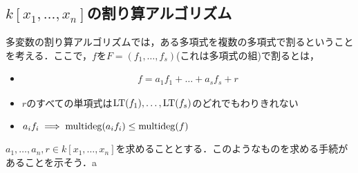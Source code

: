 \documentclass[9pt]{ltjsarticle}
\begin{document}
\subsection{$k[x_1,\dots,x_n]$の割り算アルゴリズム}
多変数の割り算アルゴリズムでは，ある多項式を複数の多項式で割るということを考える．ここで，$f$を$F=(f_1,\dots,f_s)$(これは多項式の組)で割るとは，
\begin{itemize}
 \item
\begin{align}
 f = a_1 f_1 + \dots + a_s f_s + r
\end{align}
 \item
$r$のすべての単項式は${\rm LT}(f_1),\dots,{\rm LT}(f_s)$のどれでもわりきれない
 \item $a_i f_i \implies \mathrm{multideg}(a_i f_i) \le \mathrm{multideg}(f)$
\end{itemize}
$a_1,\dots,a_n,r \in k[x_1,\dots,x_n]$を求めることとする．このようなものを求める手続があることを示そう．a
\end{document}
